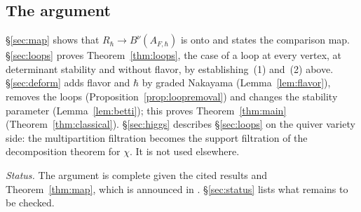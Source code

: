 \documentclass[11pt]{amsart}
\begin{document}
\subsection{The argument}\label{ss:route}
\S\ref{sec:map} shows that $R_\hbar\to B^\nu(A_{F,\hbar})$ is onto and states
the comparison map.  \S\ref{sec:loops} proves Theorem~\ref{thm:loops}, the case
of a loop at every vertex, at determinant stability and without flavor, by
establishing~(1) and~(2) above.  \S\ref{sec:deform} adds flavor and $\hbar$ by
graded Nakayama (Lemma~\ref{lem:flavor}), removes the loops
(Proposition~\ref{prop:loopremoval}) and changes the stability parameter
(Lemma~\ref{lem:betti}); this proves Theorem~\ref{thm:main}
(Theorem~\ref{thm:classical}).  \S\ref{sec:higgs} describes \S\ref{sec:loops}
on the quiver variety side: the multipartition filtration becomes the support
filtration of the decomposition theorem for $\chi$.  It is not used
elsewhere.

\emph{Status.}  The argument is complete given the cited results and
Theorem~\ref{thm:map}, which is announced in \cite{bottaQuasimapCritical2026}.
\S\ref{sec:status} lists what remains to be checked.
\end{document}
